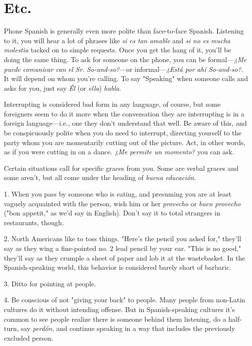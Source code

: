 \documentclass[14pt,a4paper,oneside]{memoir}
\newcommand{\bsk}{\vspace{20pt}}
\begin{document}
\section{Etc.}

Phone Spanish is generally even more polite than face-to-face
Spanish. Listening to it, you will hear a lot of phrases like \emph{si es tan
	amable} and \emph{si no es mucha molestia} tacked on to simple requests.
Once you get the hang of it, you'll be doing the same thing. To ask for
someone on the phone, you can be formal---\emph{¿Me puede comunicar can
	el Sr. So-and-so?}---or informal---\emph{¿Está por ahí So-and-so?}. It will depend on whom you're calling. To say "Speaking" when someone calls
and asks for you, just say \emph{Él} (or \emph{ella}) \emph{habla}.

Interrupting is considered bad form in any language, of course,
but some foreigners seem to do it more when the conversation they are
interrupting is in a foreign language---i.e., one they don't understand
that well. Be aware of this, and be conspicuously polite when you do
need to interrupt, directing yourself to the party whom you are momentarily cutting out of the picture. Act, in other words, as if you were
cutting in on a dance. \emph{¿Me permite un momento?} you can ask.

Certain situations call for specific graces from you. Some are
verbal graces and some aren't, but all come under the heading of \emph{buena educación}.

\bsk

1. When you pass by someone who is eating, and presuming
you are at least vaguely acquainted with the person, wish him or her
\emph{provecho} or \emph{buen provecho} ("bon appetit," as we'd say in English).
Don't say it to total strangers in restaurants, though.

2. North Americans like to toss things. "Here's the pencil you
asked for," they'll say as they wing a fine-pointed no. 2 lead pencil by
your ear. "This is no good," they'll say as they crumple a sheet of paper
and lob it at the wastebasket. In the Spanish-speaking world, this behavior is considered barely short of barbaric.

3. Ditto for pointing at people.

4. Be conscious of not "giving your back" to people. Many
people from non-Latin cultures do it without intending offense. But in
Spanish-speaking cultures it's common to see people realize there is
someone behind them listening, do a half-turn, say \emph{perdón}, and continue speaking in a way that includes the previously excluded person.
\end{document}
